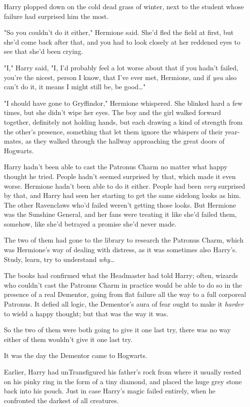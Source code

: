 Harry plopped down on the cold dead grass of winter, next to the student whose
failure had surprised him the most.

"So you couldn't do it either," Hermione said. She'd fled the field at first,
but she'd come back after that, and you had to look closely at her reddened
eyes to see that she'd been crying.

"I," Harry said, "I, I'd probably feel a lot worse about that if you hadn't
failed, you're the nicest, person I know, that I've ever met, Hermione, and if
\emph{you} also can't do it, it means I might still be, be good…"

"I should have gone to Gryffindor," Hermione whispered. She blinked hard a few
times, but she didn't wipe her eyes.
\later
The boy and the girl walked forward together, definitely not holding hands, but
each drawing a kind of strength from the other's presence, something that let
them ignore the whispers of their year-mates, as they walked through the
hallway approaching the great doors of Hogwarts.

Harry hadn't been able to cast the Patronus Charm no matter what happy thought
he tried. People hadn't seemed surprised by that, which made it even worse.
Hermione hadn't been able to do it either. People had been \emph{very}
surprised by that, and Harry had seen her starting to get the same sidelong
looks as him. The other Ravenclaws who'd failed weren't getting those looks.
But Hermione was the Sunshine General, and her fans were treating it like she'd
failed them, somehow, like she'd betrayed a promise she'd never made.

The two of them had gone to the library to research the Patronus Charm, which
was Hermione's way of dealing with distress, as it was sometimes also Harry's.
Study, learn, try to understand \emph{why…}

The books had confirmed what the Headmaster had told Harry; often, wizards who
couldn't cast the Patronus Charm in practice would be able to do so in the
presence of a real Dementor, going from flat failure all the way to a full
corporeal Patronus. It defied all logic, the Dementor's aura of fear ought to
make it \emph{harder} to wield a happy thought; but that was the way it was.

So the two of them were both going to give it one last try, there was no way
either of them wouldn't give it one last try.

It was the day the Dementor came to Hogwarts.

Earlier, Harry had unTransfigured his father's rock from where it usually
rested on his pinky ring in the form of a tiny diamond, and placed the huge
grey stone back into his pouch. Just in case Harry's magic failed entirely,
when he confronted the darkest of all creatures.

